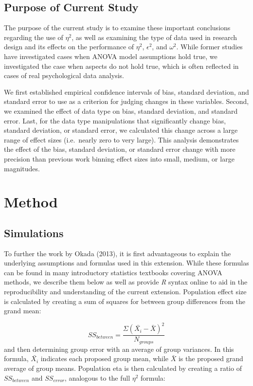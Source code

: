 \documentclass[english,man]{apa6}
\theoremstyle{definition}
\theoremstyle{definition}
\theoremstyle{definition}
\theoremstyle{remark}
\begin{document}
\subsection{Purpose of Current Study}\label{purpose-of-current-study}

The purpose of the current study is to examine these important
conclusions regarding the use of \(\eta^2\), as well as examining the
type of data used in research design and its effects on the performance
of \(\eta^2\), \(\epsilon^2\), and \(\omega^2\). While former studies
have investigated cases when ANOVA model assumptions hold true, we
investigated the case when aspects do not hold true, which is often
reflected in cases of real psychological data analysis.

We first established empirical confidence intervals of bias, standard
deviation, and standard error to use as a criterion for judging changes
in these variables. Second, we examined the effect of data type on bias,
standard deviation, and standard error. Last, for the data type
manipulations that significantly change bias, standard deviation, or
standard error, we calculated this change across a large range of effect
sizes (i.e.~nearly zero to very large). This analysis demonstrates the
effect of the bias, standard deviation, or standard error change with
more precision than previous work binning effect sizes into small,
medium, or large magnitudes.

\section{Method}\label{method}

\subsection{Simulations}\label{simulations}

To further the work by Okada (2013), it is first advantageous to explain
the underlying assumptions and formulas used in this extension. While
these formulas can be found in many introductory statistics textbooks
covering ANOVA methods, we describe them below as well as provide
\emph{R} syntax online to aid in the reproducibility and understanding
of the current extension. Population effect size is calculated by
creating a sum of squares for between group differences from the grand
mean:

\[
SS_{between} = \frac{\Sigma (\bar{X_{i}} - \bar{X})^2} {N_{groups}}
\] and then determining group error with an average of group variances.
In this formula, \(\bar{X_{i}}\) indicates each proposed group mean,
while \(\bar{X}\) is the proposed grand average of group means.
Population eta is then calculated by creating a ratio of
\(SS_{between}\) and \(SS_{error}\), analogous to the full \(\eta^2\)
formula:
\end{document}

